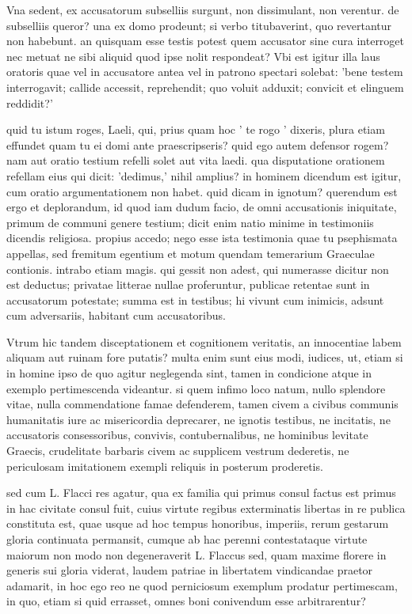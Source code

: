  Vna sedent, ex accusatorum subselliis surgunt, non dissimulant, non verentur. de subselliis queror? una ex domo prodeunt; si verbo titubaverint, quo revertantur non habebunt. an quisquam esse testis potest quem accusator sine cura interroget nec metuat ne sibi aliquid quod ipse nolit respondeat? Vbi est igitur illa laus oratoris quae vel in accusatore antea vel in patrono spectari solebat: 'bene testem interrogavit; callide accessit, reprehendit; quo voluit adduxit; convicit et elinguem reddidit?'

 quid tu istum roges, Laeli, qui, prius quam hoc ' te rogo ' dixeris, plura etiam effundet quam tu ei domi ante praescripseris? quid ego autem defensor rogem? nam aut oratio testium refelli solet aut vita laedi. qua disputatione orationem refellam eius qui dicit: 'dedimus,' nihil amplius? in hominem dicendum est igitur, cum oratio argumentationem non habet. quid dicam in ignotum? querendum est ergo et deplorandum, id quod iam dudum facio, de omni accusationis iniquitate, primum de communi genere testium; dicit enim natio minime in testimoniis dicendis religiosa. propius accedo; nego esse ista testimonia quae tu psephismata appellas, sed fremitum egentium et motum quendam temerarium Graeculae contionis. intrabo etiam magis. qui gessit non adest, qui numerasse dicitur non est deductus; privatae litterae nullae proferuntur, publicae retentae sunt in accusatorum potestate; summa est in testibus; hi vivunt cum inimicis, adsunt cum adversariis, habitant cum accusatoribus.

 Vtrum hic tandem disceptationem et cognitionem veritatis, an innocentiae labem aliquam aut ruinam fore putatis? multa enim sunt eius modi, iudices, ut, etiam si in homine ipso de quo agitur neglegenda sint, tamen in condicione atque in exemplo pertimescenda videantur. si quem infimo loco natum, nullo splendore vitae, nulla commendatione famae defenderem, tamen civem a civibus communis humanitatis iure ac misericordia deprecarer, ne ignotis testibus, ne incitatis, ne accusatoris consessoribus, convivis, contubernalibus, ne hominibus levitate Graecis, crudelitate barbaris civem ac supplicem vestrum dederetis, ne periculosam imitationem exempli reliquis in posterum proderetis.

 sed cum L. Flacci res agatur, qua ex familia qui primus consul factus est primus in hac civitate consul fuit, cuius virtute regibus exterminatis libertas in re publica constituta est, quae usque ad hoc tempus honoribus, imperiis, rerum gestarum gloria continuata permansit, cumque ab hac perenni contestataque virtute maiorum non modo non degeneraverit L. Flaccus sed, quam maxime florere in generis sui gloria viderat, laudem patriae in libertatem vindicandae praetor adamarit, in hoc ego reo ne quod perniciosum exemplum prodatur pertimescam, in quo, etiam si quid errasset, omnes boni conivendum esse arbitrarentur?


